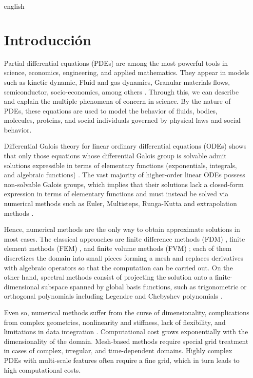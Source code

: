 \documentclass[11pt,letterpaper,twoside,openright]{book} %
\newcommand{\capitulosinnumero}[1]{\chapter*{#1}\phantomsection\addcontentsline{toc}{chapter}{#1}\markboth{#1}{}}
\begin{document}
\begin{hyphenrules}{english}

\capitulosinnumero{Introducción}\label{ch:introduction}

Partial differential equations (PDEs) are among the most powerful tools in science, economics,
engineering, and applied mathematics. They appear in models such as kinetic dynamic, Fluid and gas dynamics, Granular materials flows, semiconductor, socio-economics, among others \cite{markowich2007applied}.
Through this, we can describe and explain the multiple phenomena of concern in science. By the nature
of PDEs, these equations are used to model the behavior of fluids, bodies, molecules, proteins, and
social individuals governed by physical laws and social behavior.

Differential Galois theory for linear ordinary differential equations (ODEs) shows that only those
equations whose differential Galois group is solvable admit solutions expressible in terms of
elementary functions (exponentials, integrals, and algebraic functions)
\cite{vanderput2003}. The vast majority of higher-order linear ODEs possess
non-solvable Galois groups, which implies that their solutions lack a closed-form expression in terms
of elementary functions and must instead be solved via numerical methods such as Euler, Multisteps,  Runga-Kutta and extrapolation methods \cite{hairer1993solving, iserles1996first}.

Hence, numerical methods are the only way to obtain approximate solutions in most cases. The classical
approaches are finite difference methods (FDM) \cite{strikwerda2004}, finite element methods (FEM)
\cite{zienkiewicz2013}, and finite volume methods (FVM) \cite{moukalled2016}; each of them
discretizes the domain into small pieces forming a mesh and replaces derivatives with algebraic
operators so that the computation can be carried out. On the other hand, spectral methods consist of
projecting the solution onto a finite-dimensional subspace spanned by global basis functions, such as
trigonometric or orthogonal polynomials including Legendre and Chebyshev polynomials
\cite{shen2011}.

Even so, numerical methods suffer from the curse of dimensionality, complications from complex
geometries, nonlinearity and stiffness, lack of flexibility, and limitations in data integration
\cite{schwencke2025thesis}. Computational cost grows exponentially with the dimensionality of the
domain. Mesh-based methods require special grid treatment in cases of complex, irregular, and
time-dependent domains. Highly complex PDEs with multi-scale features often require a fine grid,
which in turn leads to high computational costs.


\end{hyphenrules}
\end{document}
